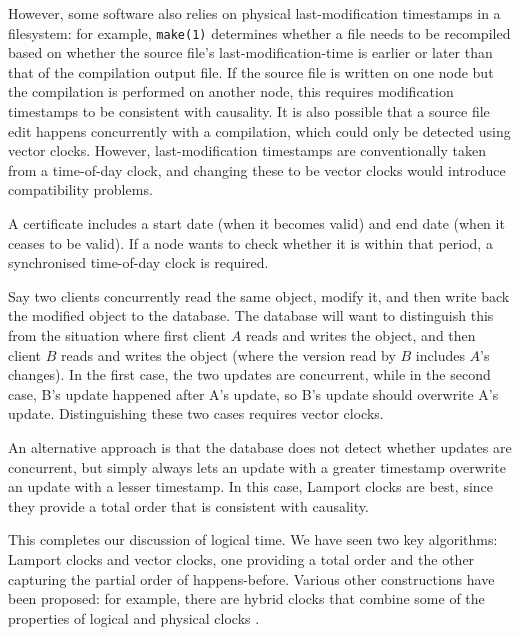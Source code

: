 {\begin{description}
            However, some software also relies on physical last-modification timestamps in a filesystem: for example, \texttt{make(1)} determines whether a file needs to be recompiled based on whether the source file's last-modification-time is earlier or later than that of the compilation output file.
            If the source file is written on one node but the compilation is performed on another node, this requires modification timestamps to be consistent with causality.
            It is also possible that a source file edit happens concurrently with a compilation, which could only be detected using vector clocks.
            However, last-modification timestamps are conventionally taken from a time-of-day clock, and changing these to be vector clocks would introduce compatibility problems.
        \item [Cryptographic certificate validity:]
            A certificate includes a start date (when it becomes valid) and end date (when it ceases to be valid).
            If a node wants to check whether it is within that period, a synchronised time-of-day clock is required.
        \item [Concurrent database updates:]
            Say two clients concurrently read the same object, modify it, and then write back the modified object to the database.
            The database will want to distinguish this from the situation where first client $A$ reads and writes the object, and then client $B$ reads and writes the object (where the version read by $B$ includes $A$'s changes).
            In the first case, the two updates are concurrent, while in the second case, B's update happened after A's update, so B's update should overwrite A's update.
            Distinguishing these two cases requires vector clocks.

            An alternative approach is that the database does not detect whether updates are concurrent, but simply always lets an update with a greater timestamp overwrite an update with a lesser timestamp.
            In this case, Lamport clocks are best, since they provide a total order that is consistent with causality.
    \end{description}
}

This completes our discussion of logical time.
We have seen two key algorithms: Lamport clocks and vector clocks, one providing a total order and the other capturing the partial order of happens-before.
Various other constructions have been proposed: for example, there are hybrid clocks that combine some of the properties of logical and physical clocks \citep{Kulkarni:2014}.


